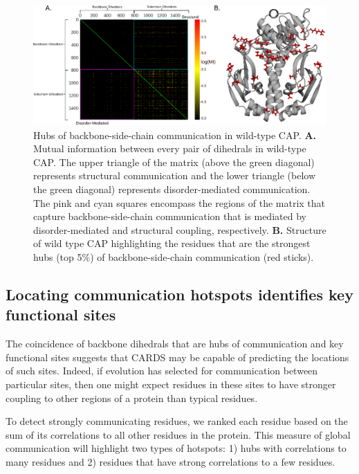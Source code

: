 \documentclass[../main.tex]{subfiles}
\begin{document}
    \begin{figure}[!htb] %
        \centering
        \includegraphics[width=6in]{cap-bb-sc-matrix-fig.eps}
        \caption[Hubs of backbone-side-chain communication in wild-type CAP.]
            {Hubs of backbone-side-chain communication in wild-type CAP. \textbf{A.} Mutual information between every pair of dihedrals in wild-type CAP. The upper triangle of the matrix (above the green diagonal) represents structural communication and the lower triangle (below the green diagonal) represents disorder-mediated communication. The pink and cyan squares encompass the regions of the matrix that capture backbone-side-chain communication that is mediated by disorder-mediated and structural coupling, respectively. \textbf{B.} Structure of wild type CAP highlighting the residues that are the strongest hubs (top 5\%) of backbone-side-chain communication (red sticks).}
        \label{fig:cap-bb-sc-matrix-fig}
    \end{figure} 

    \subsection{Locating communication hotspots identifies key functional sites}
        The coincidence of backbone dihedrals that are hubs of communication and key functional sites suggests that CARDS may be capable of predicting the locations of such sites. Indeed, if evolution has selected for communication between particular sites, then one might expect residues in these sites to have stronger coupling to other regions of a protein than typical residues.
        
        To detect strongly communicating residues, we ranked each residue based on the sum of its correlations to all other residues in the protein. This measure of global communication will highlight two types of hotspots: 1) hubs with correlations to many residues and 2) residues that have strong correlations to a few residues.
\end{document}
